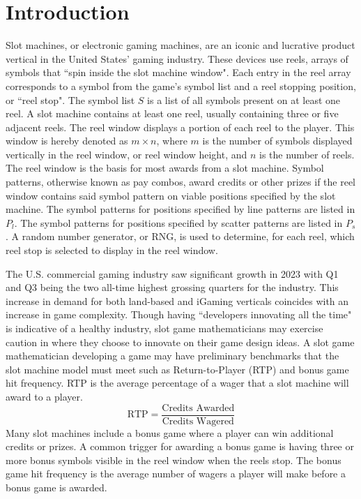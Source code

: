 \documentclass[conference]{IEEEtran}
\begin{document}
\section{Introduction}
Slot machines, or electronic gaming machines, are an iconic and lucrative product vertical in the United States' gaming industry.
These devices use reels, arrays of symbols that ``spin inside the slot machine window"\cite{SlotsDict}.
Each entry in the reel array corresponds to a symbol from the game's symbol list and a reel stopping position, or ``reel stop"\cite{SlotsDict}.
The symbol list $S$ is a list of all symbols present on at least one reel.
A slot machine contains at least one reel, usually containing three or five adjacent reels.
The reel window displays a portion of each reel to the player.
This window is hereby denoted as $m\times n$, where $m$ is the number of symbols displayed vertically in the reel window, or reel window height, and $n$ is the number of reels. 
The reel window is the basis for most awards from a slot machine.
Symbol patterns, otherwise known as pay combos, award credits or other prizes if the reel window contains said symbol pattern on viable positions specified by the slot machine.
The symbol patterns for positions specified by line patterns are listed in $P_l$.
The symbol patterns for positions specified by scatter patterns are listed in $P_s$.
A random number generator, or RNG, is used to determine, for each reel, which reel stop is selected to display in the reel window\cite{SlotsDict}.
\par
The U.S. commercial gaming industry saw significant growth in 2023 with Q1 and Q3 being the two all-time highest grossing quarters for the industry\cite{AGA2023}.
This increase in demand for both land-based and iGaming verticals coincides with an increase in game complexity.
Though having ``developers innovating all the time"\cite{Baldo2022} is indicative of a healthy industry, slot game mathematicians may exercise caution in where they choose to innovate on their game design ideas.
A slot game mathematician developing a game may have preliminary benchmarks that the slot machine model must meet such as Return-to-Player (RTP) and bonus game hit frequency. RTP is the average percentage of a wager that a slot machine will award to a player.
\begin{equation}
\text{RTP} = \frac{\text{Credits Awarded}}{\text{Credits Wagered}}
\end{equation}
Many slot machines include a bonus game where a player can win additional credits or prizes. A common trigger for awarding a bonus game is having three or more bonus symbols visible in the reel window when the reels stop. The bonus game hit frequency is the average number of wagers a player will make before a bonus game is awarded.
\end{document}
